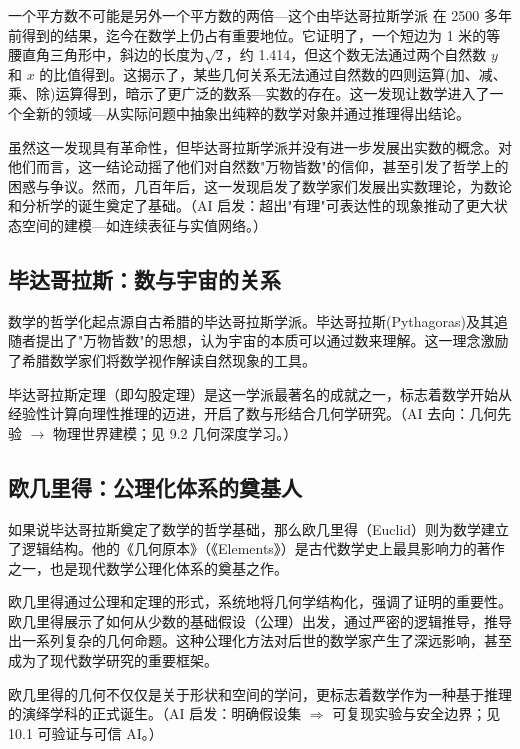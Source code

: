 一个平方数不可能是另外一个平方数的两倍---这个由毕达哥拉斯学派 在 2500 多年前得到的结果，迄今在数学上仍占有重要地位。它证明了，一个短边为 1 米的等腰直角三角形中，斜边的长度为$\sqrt{2}$，约 1.414，但这个数无法通过两个自然数 $y$ 和 $x$ 的比值得到。这揭示了，某些几何关系无法通过自然数的四则运算(加、减、乘、除)运算得到，暗示了更广泛的数系---实数的存在。这一发现让数学进入了一个全新的领域---从实际问题中抽象出纯粹的数学对象并通过推理得出结论。

虽然这一发现具有革命性，但毕达哥拉斯学派并没有进一步发展出实数的概念。对他们而言，这一结论动摇了他们对自然数"万物皆数"的信仰，甚至引发了哲学上的困惑与争议。然而，几百年后，这一发现启发了数学家们发展出实数理论，为数论和分析学的诞生奠定了基础。{（AI 启发：超出"有理"可表达性的现象推动了更大状态空间的建模---如连续表征与实值网络。）}

\subsection{毕达哥拉斯：数与宇宙的关系}


数学的哲学化起点源自古希腊的毕达哥拉斯学派。毕达哥拉斯(Pythagoras){及其}追随者提出了"万物皆数"的思想，认为宇宙的本质可以通过数来理解。这一理念激励了希腊数学家们将数学视作解读自然现象的工具。

毕达哥拉斯定理（即勾股定理）是这一学派最著名的成就之一，标志着数学开始从经验性计算向理性推理的迈进，开启了数与形结合几何学研究。{（AI 去向：几何先验 $\rightarrow$ 物理世界建模；见 9.2 几何深度学习。）}

\subsection{欧几里得：公理化体系的奠基人}


如果说毕达哥拉斯奠定了数学的哲学基础，那么欧几里得（Euclid）则为数学建立了逻辑结构。他的《几何原本》（《Elements》）是古代数学史上最具影响力的著作之一，也是现代数学公理化体系的奠基之作。

欧几里得通过公理和定理的形式，系统地将几何学结构化，强调了证明的重要性。欧几里得展示了如何从少数的基础假设（公理）出发，通过严密的逻辑推导，推导出一系列复杂的几何命题。这种公理化方法对后世的数学家产生了深远影响，甚至成为了现代数学研究的重要框架。

欧几里得的几何不仅仅是关于形状和空间的学问，更标志着数学作为一种基于推理的演绎学科的正式诞生。{（AI 启发：明确假设集 $\Rightarrow$ 可复现实验与安全边界；见 10.1 可验证与可信 AI。）}

